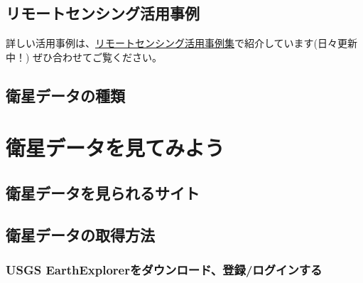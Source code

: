 \documentclass[
]{book}
\begin{document}
\hypertarget{ux30eaux30e2ux30fcux30c8ux30bbux30f3ux30b7ux30f3ux30b0ux6d3bux7528ux4e8bux4f8b}{%
\section{リモートセンシング活用事例}\label{ux30eaux30e2ux30fcux30c8ux30bbux30f3ux30b7ux30f3ux30b0ux6d3bux7528ux4e8bux4f8b}}

詳しい活用事例は、\href{https://tamak1313.github.io/casestudy/}{リモートセンシング活用事例集}で紹介しています(日々更新中！)
ぜひ合わせてご覧ください。

\hypertarget{ux885bux661fux30c7ux30fcux30bfux306eux7a2eux985e}{%
\section{衛星データの種類}\label{ux885bux661fux30c7ux30fcux30bfux306eux7a2eux985e}}

\hypertarget{ux885bux661fux30c7ux30fcux30bfux3092ux898bux3066ux307fux3088ux3046}{%
\chapter{衛星データを見てみよう}\label{ux885bux661fux30c7ux30fcux30bfux3092ux898bux3066ux307fux3088ux3046}}

\hypertarget{ux885bux661fux30c7ux30fcux30bfux3092ux898bux3089ux308cux308bux30b5ux30a4ux30c8}{%
\section{衛星データを見られるサイト}\label{ux885bux661fux30c7ux30fcux30bfux3092ux898bux3089ux308cux308bux30b5ux30a4ux30c8}}

\hypertarget{ux885bux661fux30c7ux30fcux30bfux306eux53d6ux5f97ux65b9ux6cd5}{%
\section{衛星データの取得方法}\label{ux885bux661fux30c7ux30fcux30bfux306eux53d6ux5f97ux65b9ux6cd5}}

\hypertarget{usgs-earthexplorerux3092ux30c0ux30a6ux30f3ux30edux30fcux30c9ux767bux9332ux30edux30b0ux30a4ux30f3ux3059ux308b}{%
\subsection{USGS EarthExplorerをダウンロード、登録/ログインする}\label{usgs-earthexplorerux3092ux30c0ux30a6ux30f3ux30edux30fcux30c9ux767bux9332ux30edux30b0ux30a4ux30f3ux3059ux308b}}
\end{document}
